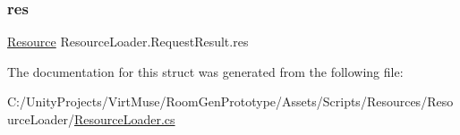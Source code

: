 \mbox{\label{struct_resource_loader_1_1_request_result_a2353513b4074450d6c7dd353d17c0271}} 
\subsubsection{\texorpdfstring{res}{res}}
{\footnotesize\ttfamily \mbox{\hyperlink{class_resource}{Resource}} Resource\+Loader.\+Request\+Result.\+res}



The documentation for this struct was generated from the following file\+:\begin{DoxyCompactItemize}
\item 
C\+:/\+Unity\+Projects/\+Virt\+Muse/\+Room\+Gen\+Prototype/\+Assets/\+Scripts/\+Resources/\+Resource\+Loader/\mbox{\hyperlink{_resource_loader_8cs}{Resource\+Loader.\+cs}}\end{DoxyCompactItemize}
